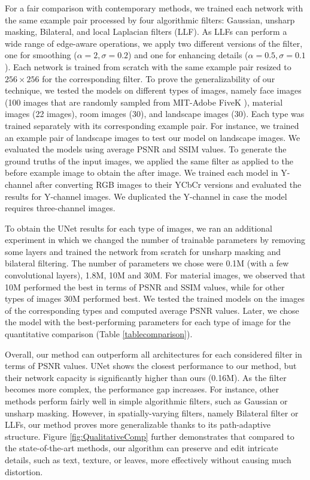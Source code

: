 For a fair comparison with contemporary methods, we trained each network with the same example pair processed by four algorithmic filters: Gaussian, unsharp masking, Bilateral, and local Laplacian filters (LLF). As LLFs can perform a wide range of edge-aware operations, we apply two different versions of the filter, one for smoothing ($\alpha=2,  \sigma=0.2$) and one for enhancing details ($\alpha=0.5, \sigma=0.1$). Each network is trained from scratch with the same example pair resized to $256 \times 256$ for the corresponding filter. 
To prove the generalizability of our technique, we tested the models on different types of images, namely face images (100 images that are randomly sampled from MIT-Adobe FiveK \cite{Bychkovsky11Learning}), material images (22 images), room images (30), and landscape images (30). Each type was trained separately with its corresponding example pair. For instance, we trained an example pair of landscape images to test our model on landscape images. We evaluated the models using average PSNR and SSIM values. To generate the ground truths of the input images, we applied the same filter as applied to the before example image to obtain the after image. We trained each model in Y-channel after converting RGB images to their YCbCr versions and evaluated the results for Y-channel images. We duplicated the Y-channel in case the model requires three-channel images. 


To obtain the UNet results for each type of images, we ran an additional experiment in which we changed the number of trainable parameters by removing some layers and trained the network from scratch for unsharp masking and bilateral filtering. The number of parameters we chose were 0.1M (with a few convolutional layers), 1.8M, 10M and 30M. For material images, we observed that 10M performed the best in terms of PSNR and SSIM values, while for other types of images 30M performed best. We tested the trained models on the images of the corresponding types and computed average PSNR values. Later, we chose the model with the best-performing parameters for each type of image for the quantitative comparison (Table \ref{tablecomparison}).

Overall, our method can outperform all architectures for each considered filter in terms of PSNR values. UNet shows the closest performance to our method, but their network capacity is significantly higher than ours (0.16M). As the filter becomes more complex, the performance gap increases. For instance, other methods perform fairly well in simple algorithmic filters, such as Gaussian or unsharp masking. However, in spatially-varying filters, namely Bilateral filter or LLFs, our method proves more generalizable thanks to its path-adaptive structure. Figure \ref{fig:QualitativeComp} further demonstrates that compared to the state-of-the-art methods, our algorithm can preserve and edit intricate details, such as text, texture, or leaves, more effectively without causing much distortion. 



